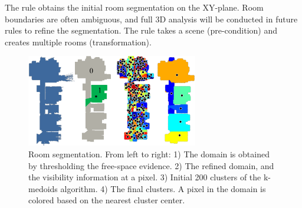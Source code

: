  The rule obtains the initial room
segmentation on the XY-plane. Room boundaries are often ambiguous, and
full 3D analysis will be conducted in future rules to refine the
segmentation. The rule takes a scene (pre-condition) and creates
multiple rooms (transformation).
%
%
%
%
\begin{figure}[!t]
\begin{center}
 \includegraphics[width=75mm]{../figures/k-medoids2.pdf}
\end{center}
\caption{Room segmentation. From left to right: 1) The domain is
 obtained by thresholding the free-space evidence. 2) The refined
 domain, and the visibility information at a pixel. 3) Initial 200 clusters
 of the k-medoids algorithm. 4) The final clusters. A pixel in the
 domain is colored based on the nearest cluster center.
 }
\label{fig:k-medoids}
 \vspace{-0.325cm}
\end{figure}


